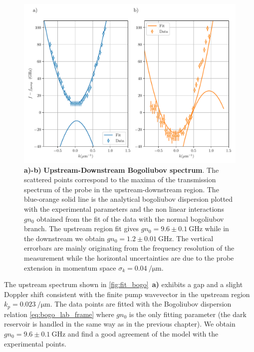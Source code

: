 \begin{figure}
    \centering
    \includegraphics[width=1\textwidth]{chap_stimulated_hawking/fig/fit_bogo.pdf}
    \caption{\textbf{a)-b)} \textbf{Upstream-Downstream Bogoliubov spectrum}. The scattered points correspond to the maxima of the transmission spectrum of the probe in the upstream-downstream region. The blue-orange solid 
    line is the analytical bogoliubov dispersion plotted with the experimental parameters and the non linear interactions $gn_0$ obtained from
    the fit of the data with the normal bogoliubov branch. The upstream region fit gives $gn_0 =9.6 \pm \SI{0.1}{\giga \hertz}$ while in the downstream we obtain $gn_0=1.2\pm \SI{0.01}{\giga \hertz}$.
    The vertical errorbars are mainly originating from the frequency resolution of the measurement while the horizontal uncertainties are due to the probe extension in momentum space $\sigma_k =\SI{0.04}{\per \micro \meter}$.}
    \label{fig:fit_bogo}
\end{figure}
\bigskip 

The upstream spectrum shown in \autoref{fig:fit_bogo}~\textbf{a)} exhibits a gap and a slight Doppler shift consistent with the finite pump wavevector in the upstream region $k_p=\SI{0.023}{\per \micro \meter}$. The data points are fitted with the Bogoliubov dispersion relation \ref{eq:bogo_lab_frame} where $gn_0$ is the only fitting parameter (the dark reservoir
is handled in the same way as in the previous chapter). 
We obtain $gn_0=9.6\pm\SI{0.1}{\giga \hertz}$ and find a good agreement of the model with the experimental points.

